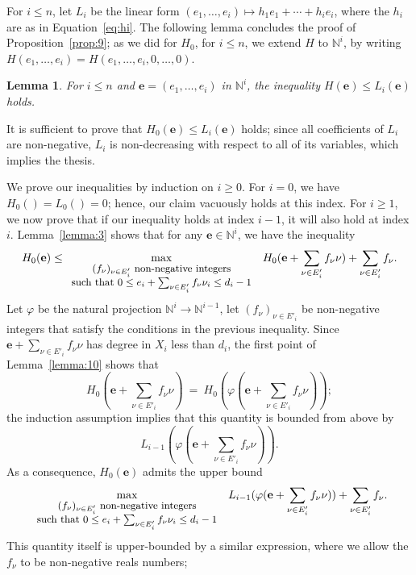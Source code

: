 \documentclass[amsthm]{elsart}
\def\e {\ensuremath{\mathbf{e}}}
\def\N {\ensuremath{\mathbb{N}}}
\theoremstyle{plain}
\newtheorem{Lemma}{Lemma}
\begin{document}
For $i \le n$, let $L_i$ be the linear form $(e_1,\dots,e_i) \mapsto
h_1 e_1 + \cdots + h_{i} e_{i}$, where the $h_i$ are as in
Equation~\eqref{eq:hi}. The following lemma concludes the proof of
Proposition~\ref{prop:9}; as we did for $H_0$, for $i\le n$, we extend
$H$ to $\N^i$, by writing
$H(e_1,\dots,e_i)=H(e_1,\dots,e_i,0,\dots,0)$.
\begin{Lemma}
  For $i \le n$ and $\e=(e_1,\dots,e_i)$ in $\N^i$, the inequality
  $H(\e)\le L_i(\e)$ holds.
\end{Lemma}
\begin{pf}
  It is sufficient to prove that $H_0(\e)\le L_i(\e)$ holds; since all
  coefficients of $L_i$ are non-negative, $L_i$ is non-decreasing with
  respect to all of its variables, which implies the thesis.  

  We prove our inequalities by induction on $i\ge 0$. For $i=0$, we
  have $H_0()=L_0()=0$; hence, our claim vacuously holds at this
  index.
For $i \ge 1$, we now prove that if our inequality holds at index
  $i-1$, it will also hold at index $i$. Lemma~\ref{lemma:3} shows
  that for any ${\e} \in \N^i$, we have the inequality
$$H_0(\e) \le \max_{\small
\begin{array}{c}
(f_\nu)_{\nu \in E'_i} \text{~non-negative integers}\\
\text{such~that~}  0 \le e_i + \sum_{\nu \in E'_i} f_\nu \nu_i \le d_i-1
\end{array}
}\ H_0(\e + \sum_{\nu \in E'_i} f_\nu \nu)+ \sum_{\nu \in E'_i}
f_\nu.$$ Let $\varphi$ be the natural projection $\N^i \to \N^{i-1}$,
let $(f_\nu)_{\nu \in E'_i}$ be non-negative integers that satisfy the
conditions in the previous inequality. Since $\e + \sum_{\nu \in E'_i}
f_\nu \nu$ has degree in $X_i$ less than $d_i$, the first point of
Lemma~\ref{lemma:10} shows that
$$H_0(\e + \sum_{\nu \in E'_i} f_\nu \nu) \ = \ 
H_0(\varphi(\e + \sum_{\nu \in E'_i} f_\nu \nu));$$ 
the induction assumption implies that this quantity 
is bounded from above by 
$$L_{i-1}(\varphi(\e + \sum_{\nu \in E'_i} f_\nu \nu)).$$
As a consequence, $H_0(\e)$ admits the upper
bound 
$$\max_{\small
\begin{array}{c}
(f_\nu)_{\nu \in E'_i} \text{~non-negative integers}\\
\text{such~that~}  0 \le e_i + \sum_{\nu \in E'_i} f_\nu \nu_i \le d_i-1
\end{array}
}\ L_{i-1}(\varphi(\e + \sum_{\nu \in E'_i} f_\nu \nu))+\sum_{\nu \in
  E'_i} f_\nu.$$ This quantity itself is upper-bounded by a similar
expression, where we allow the $f_\nu$ to be non-negative reals numbers;

\end{pf}
\end{document}
